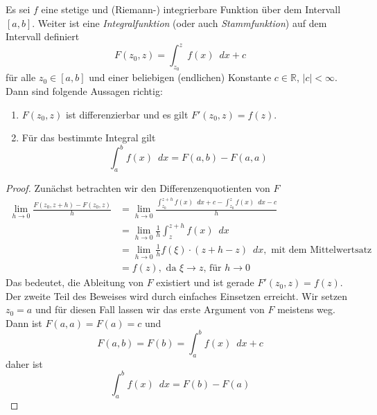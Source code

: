 \begin{satz}
Es sei $f$ eine stetige und (Riemann-) integrierbare Funktion über dem Intervall $[a,b]$. Weiter ist eine \emph{Integralfunktion} (oder auch \emph{Stammfunktion}) auf dem Intervall definiert
\begin{equation}
F(z_0,z) = \int_{z_0}^z f(x) \enspace dx + c
\end{equation}
für alle $z_0 \in [a,b]$ und einer beliebigen (endlichen) Konstante $c\in \mathbb{R}$, $|c|<\infty$. Dann sind folgende Aussagen richtig:

\begin{enumerate}
\item $F(z_0,z)$ ist differenzierbar und es gilt $F'(z_0,z) = f(z)$.
\item Für das bestimmte Integral gilt \begin{equation}
\int_a^b f(x) \enspace dx = F(a,b)-F(a,a)
\end{equation}
\end{enumerate}
\end{satz}
\begin{proof}
Zunächst betrachten wir den Differenzenquotienten von $F$
\begin{equation}
\begin{split}
\lim_{h\rightarrow 0} \frac{F(z_0,z+h)-F(z_0,z)}{h} &= \lim_{h\rightarrow 0} \frac{\int_{z_0}^{z+h} f(x)\enspace dx+c - \int_{z_0}^{z} f(x)\enspace dx-c}{h} \\
&= \lim_{h\rightarrow 0}\frac{1}{h} \int_{z}^{z+h} f(x)\enspace dx \\
&= \lim_{h\rightarrow 0}\frac{1}{h} f(\xi)\cdot (z+h-z)\enspace dx, \text{ mit dem Mittelwertsatz} \\
&= f(z), \text{ da }\xi \rightarrow z\text{, für }h\rightarrow 0
\end{split}
\end{equation}
Das bedeutet, die Ableitung von $F$ existiert und ist gerade $F'(z_0,z)=f(z)$. Der zweite Teil des Beweises wird durch einfaches Einsetzen erreicht. Wir setzen $z_0 = a$ und für diesen Fall lassen wir das erste Argument von $F$ meistens weg. Dann ist $F(a,a)=F(a)=c$ und
\begin{equation*}
F(a,b)=F(b) = \int_a^b f(x) \enspace dx +c
\end{equation*}
daher ist
\begin{equation}
\int_a^b f(x) \enspace dx = F(b)-F(a)
\end{equation}
\end{proof}

